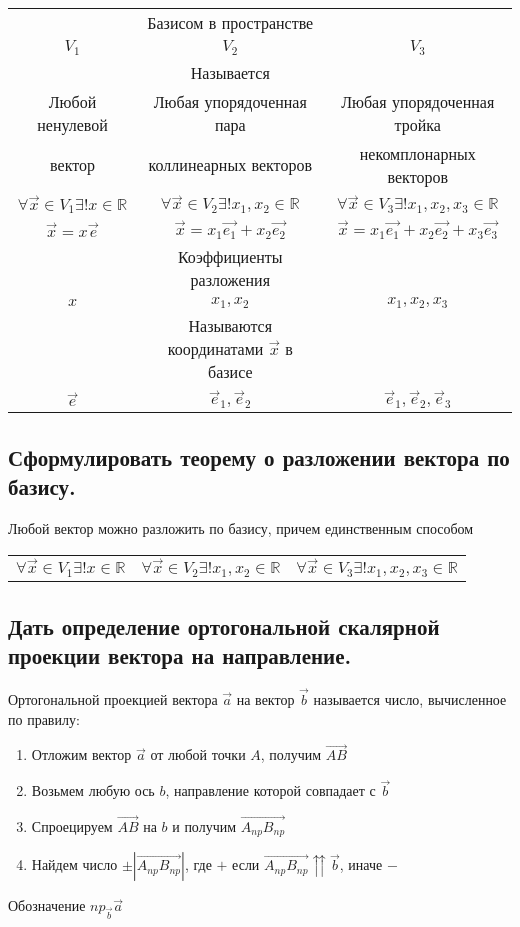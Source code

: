 \documentclass[a4paper, 10pt]{article}
\newcommand{\bvec}[1]{\overrightarrow{#1}}
\newcommand{\mcolt}[1]{&#1&}
\renewcommand{\a}{\vec{a}}
\renewcommand{\b}{\vec{b}}
\begin{document}
\begin{center}
\begin{tabular}{c c c} 
    \mcolt{Базисом в пространстве}\\
    $V_1$&$V_2$&$V_3$\\
    \mcolt{Называется}\\
    Любой ненулевой & Любая упорядоченная пара & Любая упорядоченная тройка\\
    вектор & коллинеарных векторов & некомплонарных векторов\\
    $\forall \vec{x} \in V_1 \exists ! x \in \mathbb{R}$&
    $\forall \vec{x} \in V_2 \exists ! x_1, x_2 \in \mathbb{R}$&
    $\forall \vec{x} \in V_3 \exists ! x_1, x_2, x_3 \in \mathbb{R}$\\
    $\vec{x} = x\vec{e}$ & $\vec{x} = x_1\vec{e_1} + x_2\vec{e_2}$ &
    $\vec{x} = x_1\vec{e_1} + x_2\vec{e_2} + x_3\vec{e_3}$\\
    \mcolt{Коэффициенты разложения}\\
    $x$&$x_1, x_2$&$x_1, x_2, x_3$\\
    \mcolt{Называются координатами $\vec{x}$ в базисе}\\
    $\vec{e}$&$\vec{e}_1, \vec{e}_2$&$\vec{e}_1, \vec{e}_2, \vec{e}_3$\\
\end{tabular}
\end{center}

\subsection{Сформулировать теорему о разложении вектора по базису.}

\begin{center}
Любой вектор можно разложить по базису, причем единственным способом
\begin{tabular}{c c c} 
    $\forall \vec{x} \in V_1 \exists ! x \in \mathbb{R}$&
    $\forall \vec{x} \in V_2 \exists ! x_1, x_2 \in \mathbb{R}$&
    $\forall \vec{x} \in V_3 \exists ! x_1, x_2, x_3 \in \mathbb{R}$\\
\end{tabular}
\end{center}

\subsection{Дать определение ортогональной скалярной проекции вектора на направление.}

Ортогональной проекцией вектора $\a$ на вектор $\b$ называется число, вычисленное по правилу:
\begin{enumerate}
    \item Отложим вектор $\a$ от любой точки $A$, получим $\bvec{AB}$
    \item Возьмем любую ось $b$, направление которой совпадает с $\b$
    \item Спроецируем $\bvec{AB}$ на $b$ и получим  $\bvec{A_{np}B_{np}}$
    \item Найдем число $\pm |\bvec{A_{np}B_{np}}|$, где $+$ если $\bvec{A_{np}B_{np}} \upuparrows \b$, иначе $-$
\end{enumerate}
Обозначение $np_{\b} \a$
\end{document}
